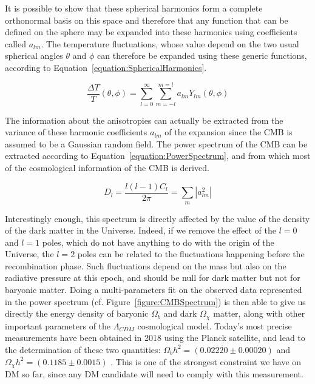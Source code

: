 \documentclass[a4paper, 10pt, openright]{report}
\begin{document}
It is possible to show that these spherical harmonics form a complete orthonormal basis on this space and therefore that any function that can be defined on the sphere may be expanded into these harmonics using coefficients called $a_{lm}$. The temperature fluctuations, whose value depend on the two usual spherical angles $\theta$ and $\phi$ can therefore be expanded using these generic functions, according to Equation~\ref{equation:SphericalHarmonics}.

\begin{equation} \label{equation:SphericalHarmonics}
\frac{\Delta T}{T}(\theta, \phi) = \sum_{l=0}^{\infty} \sum_{m=-l}^{m=l} a_{lm} Y_{lm} (\theta, \phi)
\end{equation}

The information about the anisotropies can actually be extracted from the variance of these harmonic coefficients $a_{lm}$ of the expansion since the \ac{CMB} is assumed to be a Gaussian random field. The power spectrum of the \ac{CMB} can be extracted according to Equation~\ref{equation:PowerSpectrum}, and from which most of the cosmological information of the \ac{CMB} is derived.

\begin{equation} \label{equation:PowerSpectrum}
D_l = \frac{l(l-1) C_l} {2\pi} = \sum_m |a_{lm}^2|
\end{equation}

Interestingly enough, this spectrum is directly affected by the value of the density of the dark matter in the Universe. Indeed, if we remove the effect of the $l=0$ and $l=1$ poles, which do not have anything to do with the origin of the Universe, the $l=2$ poles can be related to the fluctuations happening before the recombination phase. Such fluctuations depend on the mass but also on the radiative pressure at this epoch, and should be null for dark matter but not for baryonic matter. Doing a multi-parameters fit on the observed data represented in the power spectrum (cf. Figure~\ref{figure:CMBSpectrum}) is then able to give us directly the energy density of baryonic $\Omega_b$ and dark $\Omega_\chi$ matter, along with other important parameters of the $\Lambda_{CDM}$ cosmological model. Today's most precise measurements have been obtained in 2018 using the Planck satellite, and lead to the determination of these two quantities: $\Omega_b h^2 = (0.02220 \pm 0.00020)$ and $\Omega_\chi h^2 = (0.1185 \pm 0.0015)$ \cite{Planck}. This is one of the strongest constraint we have on \ac{DM} so far, since any \ac{DM} candidate will need to comply with this measurement.
\end{document}
